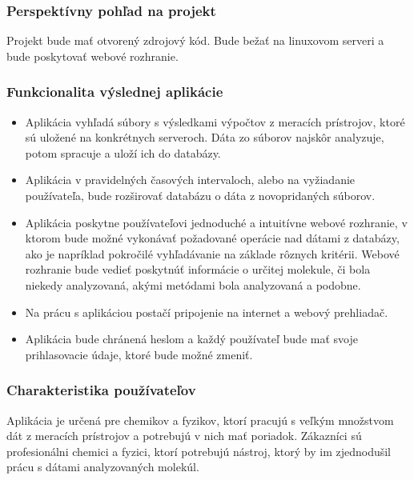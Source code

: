 \documentclass[12pt,a4paper]{article}
\begin{document}
\subsubsection{Perspektívny pohľad na projekt}
Projekt bude mať otvorený zdrojový kód. Bude bežať na linuxovom serveri a bude poskytovať webové rozhranie.

\subsubsection{Funkcionalita výslednej aplikácie}
\begin{itemize}
	\item Aplikácia vyhľadá súbory s výsledkami výpočtov z meracích prístrojov, ktoré sú uložené na konkrétnych serveroch. Dáta zo súborov najskôr analyzuje, potom spracuje a uloží ich do databázy.
	\item Aplikácia v pravidelných časových intervaloch, alebo na vyžiadanie používateľa, bude rozširovať databázu o dáta z novopridaných súborov.
	\item Aplikácia poskytne používateľovi jednoduché a intuitívne webové rozhranie, v ktorom bude možné vykonávať požadované operácie nad dátami z databázy, ako je napríklad pokročilé vyhľadávanie na základe rôznych kritérii. Webové rozhranie bude vedieť poskytnúť informácie o určitej molekule, či bola niekedy analyzovaná, akými metódami bola analyzovaná a podobne.
	\item Na prácu s aplikáciou postačí pripojenie na internet a webový prehliadač.
	\item Aplikácia bude chránená heslom a každý používateľ bude mať svoje prihlasovacie údaje, ktoré bude možné zmeniť.
\end{itemize}

\subsubsection{Charakteristika používateľov}
Aplikácia je určená pre chemikov a fyzikov, ktorí pracujú s veľkým množstvom dát z meracích prístrojov a potrebujú v nich mať poriadok. Zákazníci sú profesionálni chemici a fyzici, ktorí potrebujú nástroj, ktorý by im zjednodušil prácu s dátami analyzovaných molekúl.
\end{document}
